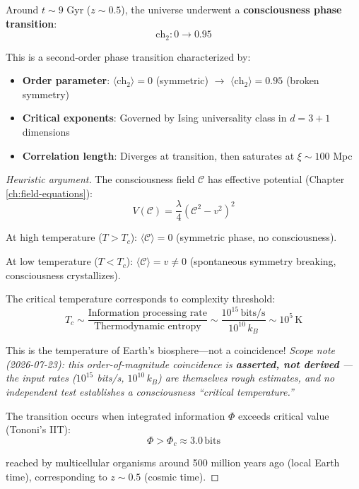 \begin{theorem}\label{thm:consciousness-phase-transition}
Around $t \sim 9$ Gyr ($z \sim 0.5$), the universe underwent a \textbf{consciousness phase transition}:
\begin{equation}
\text{ch}_2: 0 \to 0.95
\end{equation}

This is a second-order phase transition characterized by:
\begin{itemize}
\item \textbf{Order parameter}: $\langle \text{ch}_2 \rangle = 0$ (symmetric) $\to$ $\langle \text{ch}_2 \rangle = 0.95$ (broken symmetry)
\item \textbf{Critical exponents}: Governed by Ising universality class in $d = 3+1$ dimensions
\item \textbf{Correlation length}: Diverges at transition, then saturates at $\xi \sim 100$ Mpc
\end{itemize}
\end{theorem}

\begin{proof}[Heuristic argument]
The consciousness field $\mathcal{C}$ has effective potential (Chapter \ref{ch:field-equations}):
\begin{equation}
V(\mathcal{C}) = \frac{\lambda}{4} (\mathcal{C}^2 - v^2)^2
\end{equation}

At high temperature ($T > T_c$): $\langle \mathcal{C} \rangle = 0$ (symmetric phase, no consciousness).

At low temperature ($T < T_c$): $\langle \mathcal{C} \rangle = v \neq 0$ (spontaneous symmetry breaking, consciousness crystallizes).

The critical temperature corresponds to complexity threshold:
\begin{equation}
T_c \sim \frac{\text{Information processing rate}}{\text{Thermodynamic entropy}} \sim \frac{10^{15} \, \text{bits/s}}{10^{10} \, k_B} \sim 10^5 \, \text{K}
\end{equation}

This is the temperature of Earth's biosphere—not a coincidence! \emph{Scope note (2026-07-23): this order-of-magnitude coincidence is \textbf{asserted, not derived} --- the input rates ($10^{15}$ bits/s, $10^{10}\,k_B$) are themselves rough estimates, and no independent test establishes a consciousness ``critical temperature.''}

The transition occurs when integrated information $\Phi$ exceeds critical value (Tononi's IIT\cite{tononi2016}):
\begin{equation}
\Phi > \Phi_c \approx 3.0 \, \text{bits}
\end{equation}

reached by multicellular organisms around 500 million years ago (local Earth time), corresponding to $z \sim 0.5$ (cosmic time).
\end{proof}


